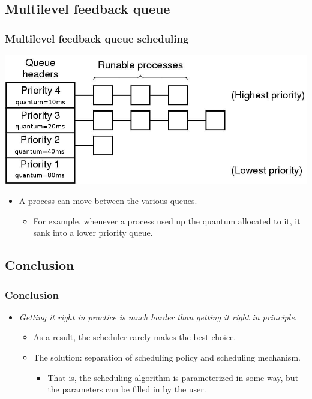 \documentclass[CJKutf8,xcolor=pdftex,dvipsnames,table]{beamer}
\begin{document}
\begin{CJK*}{UTF8}{song}
  \subsection{Multilevel feedback queue}

  \begin{frame}
  \frametitle{Multilevel feedback queue scheduling} \pause
  \begin{center}
    \includegraphics[scale=0.4]{mlfbq} \pause
  \end{center}
  \begin{itemize}
  \item{A process can move between the various queues.} \pause
    \begin{itemize}
    \item{For example, whenever a process used up the quantum allocated to it, it sank into a lower priority queue.}
    \end{itemize}
  \end{itemize}
  \end{frame}
  
  \subsection{Conclusion}

  \begin{frame}
  \frametitle{Conclusion} \pause
  \begin{itemize}
  \item{\emph{Getting it right in practice is much harder than getting it right in principle}.} \pause
    \begin{itemize}
    \item{As a result, the scheduler rarely makes the best choice.} \pause
    \item{The solution: \pause separation of scheduling policy and scheduling mechanism.} \pause
      \begin{itemize}
      \item{That is, the scheduling algorithm is parameterized in some way, but the parameters can be filled in by the user.}
      \end{itemize}
    \end{itemize}
  \end{itemize}
  \end{frame}
  

\end{CJK*}
\end{document}
